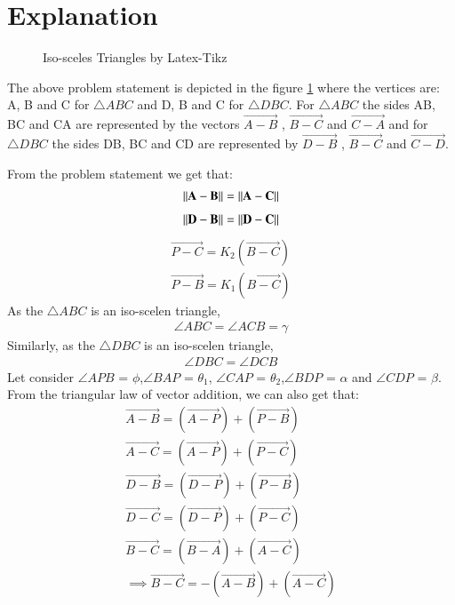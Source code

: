 \documentclass[journal,12pt,twocolumn]{IEEEtran}
\begin{document}
\section{Explanation}
\begin{figure}[!ht]
\centering
\resizebox{\columnwidth}{!}{}
\caption{Iso-sceles Triangles by Latex-Tikz}
\label{fig:iso_scelen}	
\end{figure}

The above problem statement is depicted in the figure \ref{fig:iso_scelen} where the vertices are: A, B and C for $\triangle ABC$ and D, B and C for $\triangle DBC$. For $\triangle ABC$ the sides AB, BC and CA are represented by the vectors $\vec{A-B}$ , $\vec{B-C}$ and $\vec{C-A}$ and for $\triangle DBC$ the sides DB, BC and CD are represented by $\vec{D-B}$ , $\vec{B-C}$ and $\vec{C-D}$.

From the problem statement we get that:
\begin{equation}
\begin{aligned}
\left\lVert\mathbf{A}-\mathbf{B}\right\rVert = \left\lVert\mathbf{A}-\mathbf{C}\right\rVert
\end{aligned}
\end{equation}
\label{cond1}
\begin{align}
\left\lVert\mathbf{D}-\mathbf{B}\right\rVert = \left\lVert\mathbf{D}-\mathbf{C}\right\rVert
\end{align}
\label{cond2}
\begin{align}
\vec{P-C} = K_2 (\vec{B-C})\\
\vec{P-B} = K_1 (\vec{B-C})
\end{align}
As the $\triangle ABC$ is an iso-scelen triangle,
\begin{align}
\angle ABC = \angle ACB =\gamma
\end{align}
Similarly, as the $\triangle DBC$ is an iso-scelen triangle,
\begin{align}
\angle DBC = \angle DCB 
\end{align}
Let consider $\angle APB$ = $\phi$,$\angle BAP$ = $\theta_1$, $\angle CAP$ = $\theta_2$,$\angle BDP$ = $\alpha$ and $\angle CDP$ = $\beta$.
From the triangular law of vector addition, we can also get that:
\begin{align}
\vec{A-B} = (\vec{A-P}) + (\vec{P-B})\\
\vec{A-C} = (\vec{A-P}) + (\vec{P-C})\\
\vec{D-B} = (\vec{D-P}) + (\vec{P-B})\\
\vec{D-C} = (\vec{D-P}) + (\vec{P-C})\\
\vec{B-C} = (\vec{B-A}) + (\vec{A-C})\\
\implies \vec{B-C} = -(\vec{A-B}) + (\vec{A-C})
\end{align}
\end{document}
